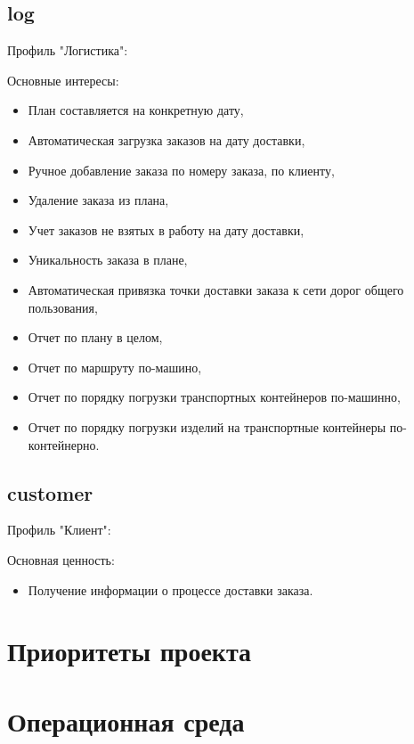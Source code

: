 \subsection{log}
\label{subsec:log}
Профиль "Логистика":

Основные интересы:
\begin{itemize}
    \item План составляется на конкретную дату,
    \item Автоматическая загрузка заказов на дату доставки,
    \item Ручное добавление заказа по номеру заказа, по клиенту,
    \item Удаление заказа из плана,
    \item Учет заказов не взятых в работу на дату доставки,
    \item Уникальность заказа в плане,
    \item Автоматическая привязка точки доставки заказа к сети дорог общего пользования,
    \item Отчет по плану в целом,
    \item Отчет по маршруту по-машино,
    \item Отчет по порядку погрузки транспортных контейнеров по-машинно,
    \item Отчет по порядку погрузки изделий на транспортные контейнеры по-контейнерно.
\end{itemize}

\subsection{customer}
\label{subsec:customer}
Профиль "Клиент":

Основная ценность:
\begin{itemize}
    \item Получение информации о процессе доставки заказа.
\end{itemize}


\section{Приоритеты проекта}
\label{sec:priorities}



\section{Операционная среда}
\label{sec:env}

\endinput
